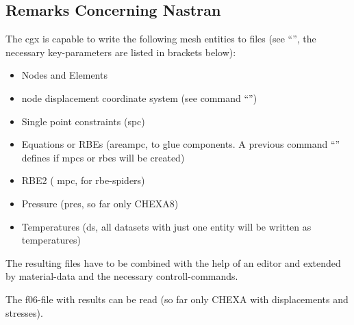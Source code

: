 \documentclass{article}
\begin{document}
\begin{appendix}
\subsection{\label{Remarks Concerning Nastran}Remarks Concerning Nastran}
The cgx is capable to write the following mesh entities to files (see ``'', the necessary key-parameters are listed in brackets below):
\begin{itemize}
\item Nodes and Elements 
\item node displacement coordinate system (see command ``'')
\item Single point constraints (spc)
\item Equations or RBEs (areampc, to glue components. A previous command ``'' defines if mpcs or rbes will be created)
\item RBE2 ( mpc, for rbe-spiders)
\item Pressure (pres, so far only CHEXA8)
\item Temperatures (ds, all datasets with just one entity will be written as temperatures)
\end{itemize}
The resulting files have to be combined with the help of an editor and extended by material-data and the necessary controll-commands. 

The f06-file with results can be read (so far only CHEXA with displacements and stresses).


\end{appendix}
\end{document}
